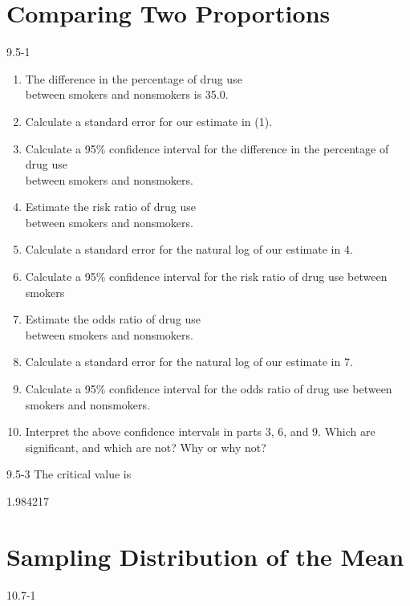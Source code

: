 \setcounter{chapter}{9}\chapter{Comparing Two Proportions }
\begin{exsol@solution}{9.5-1}


\begin{enumerate}
\item The difference in the percentage of drug use \\ between smokers and nonsmokers is 35.0.
\item Calculate a standard error for our estimate in (1).
\item Calculate a 95\% confidence interval for the difference in the percentage of drug use \\ between smokers and nonsmokers.
\item Estimate the risk ratio of drug use \\ between smokers and nonsmokers.
\item Calculate a standard error for the natural log of our estimate in 4.
\item Calculate a 95\% confidence interval for the risk ratio of drug use between smokers
\item Estimate the odds ratio of drug use \\ between smokers and nonsmokers.
\item Calculate a standard error for the natural log of our estimate in 7.
\item Calculate a 95\% confidence interval for the odds ratio of drug use between smokers and nonsmokers.
\item Interpret the above confidence intervals in parts 3, 6, and 9. Which are significant, and which are not? Why or why not?
\end{enumerate}

\end{exsol@solution}
\begin{exsol@solution}{9.5-3}
   The critical value is


  1.984217

\end{exsol@solution}
\setcounter{chapter}{10}\chapter{Sampling Distribution of the Mean}
\begin{exsol@solution}{10.7-1}
\end{exsol@solution}
